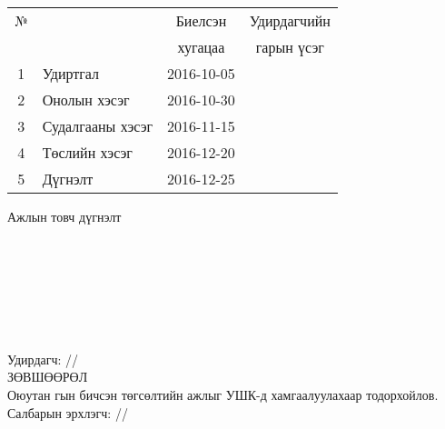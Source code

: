 \begin{titlepage}
\begin{center}
\begin{tabular}{|c|p{7cm}|c|c|}
	\hline
	№ & \makebox[7cm][c]{Хийж гүйцэтгэсэн ажил} & Биелсэн     & Удирдагчийн \\
	  &                    & хугацаа    & гарын үсэг \\ \hline
	1 & {Удиртгал}         & 2016-10-05 &  \\ \hline
	2 & {Онолын хэсэг}     & 2016-10-30 &  \\ \hline
	3 & {Судалгааны хэсэг} & 2016-11-15 &  \\ \hline
	4 & {Төслийн хэсэг}    & 2016-12-20 &  \\ \hline
	5 & {Дүгнэлт}          & 2016-12-25 &  \\ \hline
\end{tabular}

\vspace{1cm}
Ажлын товч дүгнэлт \\[0.5cm]
\dotfill \\[0.2cm]
\dotfill \\[0.2cm]
\dotfill \\[0.2cm]
\dotfill \\[0.2cm]
\dotfill \\[0.2cm]
\dotfill \\[0.2cm]
\dotfill \\[0.5cm]
Удирдагч: \makebox[3cm]{\dotfill} /\supname/ \\

\vspace{2cm}
ЗӨВШӨӨРӨЛ \\[0.5cm]
Оюутан \shortname гын бичсэн төгсөлтийн ажлыг УШК-д хамгаалуулахаар тодорхойлов.\\[0.5cm]
Салбарын эрхлэгч: \makebox[3cm]{\dotfill} /\chairname/
\end{center}

\end{titlepage}

\newpage

